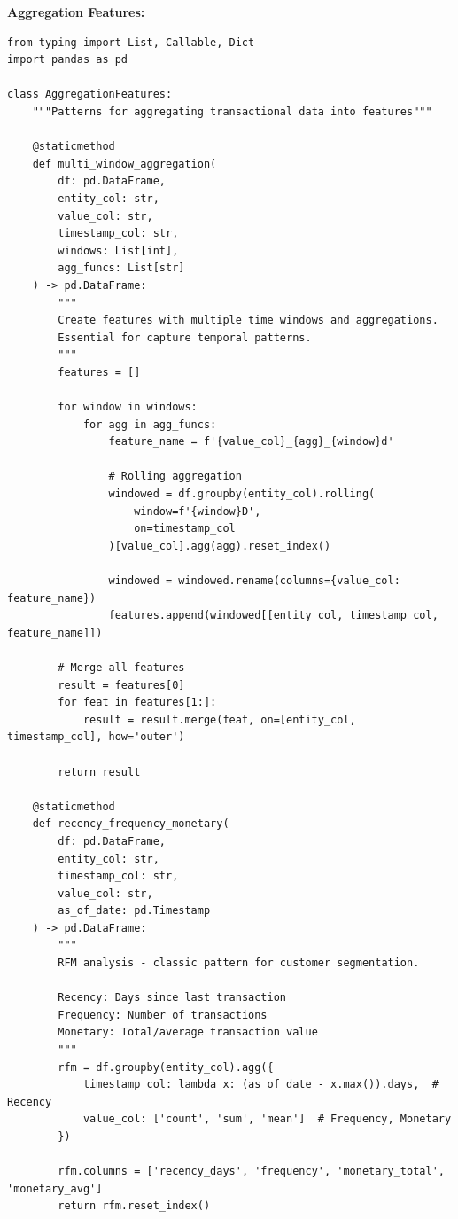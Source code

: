 \textbf{Aggregation Features:}

\begin{lstlisting}[style=python, caption=Advanced aggregation patterns for ML features]
from typing import List, Callable, Dict
import pandas as pd

class AggregationFeatures:
    """Patterns for aggregating transactional data into features"""

    @staticmethod
    def multi_window_aggregation(
        df: pd.DataFrame,
        entity_col: str,
        value_col: str,
        timestamp_col: str,
        windows: List[int],
        agg_funcs: List[str]
    ) -> pd.DataFrame:
        """
        Create features with multiple time windows and aggregations.
        Essential for capture temporal patterns.
        """
        features = []

        for window in windows:
            for agg in agg_funcs:
                feature_name = f'{value_col}_{agg}_{window}d'

                # Rolling aggregation
                windowed = df.groupby(entity_col).rolling(
                    window=f'{window}D',
                    on=timestamp_col
                )[value_col].agg(agg).reset_index()

                windowed = windowed.rename(columns={value_col: feature_name})
                features.append(windowed[[entity_col, timestamp_col, feature_name]])

        # Merge all features
        result = features[0]
        for feat in features[1:]:
            result = result.merge(feat, on=[entity_col, timestamp_col], how='outer')

        return result

    @staticmethod
    def recency_frequency_monetary(
        df: pd.DataFrame,
        entity_col: str,
        timestamp_col: str,
        value_col: str,
        as_of_date: pd.Timestamp
    ) -> pd.DataFrame:
        """
        RFM analysis - classic pattern for customer segmentation.

        Recency: Days since last transaction
        Frequency: Number of transactions
        Monetary: Total/average transaction value
        """
        rfm = df.groupby(entity_col).agg({
            timestamp_col: lambda x: (as_of_date - x.max()).days,  # Recency
            value_col: ['count', 'sum', 'mean']  # Frequency, Monetary
        })

        rfm.columns = ['recency_days', 'frequency', 'monetary_total', 'monetary_avg']
        return rfm.reset_index()


\end{lstlisting}
